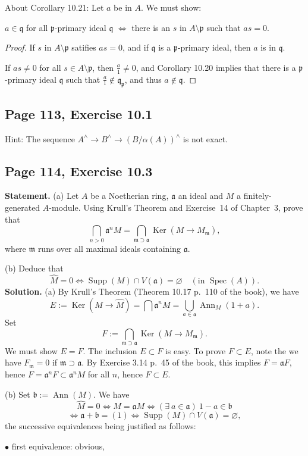 \documentclass[parskip=half,fontsize=12pt]{scrartcl}%
\newcommand{\oo}{\operatorname}\newcommand{\ooo}{\operatorname*}
\newcommand{\mf}{\mathfrak}
\newcommand{\aaa}{\mf a}
\newcommand{\bbb}{\mf b}
\newcommand{\mmm}{\mf m}
\newcommand{\ppp}{\mf p}
\newcommand{\qqq}{\mf q}
\newcommand{\bu}{\bullet}
\newcommand{\Ker}{\operatorname{Ker}}\newcommand{\Coker}{\operatorname{Coker}}
\newcommand{\Spec}{\operatorname{Spec}}\newcommand{\Sp}{\operatorname{Spec}}
\begin{document}
About Corollary 10.21: Let $a$ be in $A$. We must show: 

$a\in\qqq$ for all $\ppp$-primary ideal $\qqq$ $\iff$ there is an $s$ in $A\setminus\ppp$ such that $as=0$. 

\begin{proof} 
If $s$ in $A\setminus\ppp$ satifies $as=0$, and if $\qqq$ is a $\ppp$-primary ideal, then $a$ is in $\qqq$.

If $as\neq0$ for all $s\in A\setminus\ppp$, then $\frac a1\neq0$, and Corollary 10.20 implies that there is a $\ppp$-primary ideal $\qqq$ such that $\frac a1\notin\qqq_\ppp$, and thus $a\notin\qqq$. 
\end{proof}

\subsection{Page 113, Exercise 10.1}%

Hint: The sequence $A^\land\to B^\land\to(B/\alpha(A))^\land$ is not exact. 

\subsection{Page 114, Exercise 10.3}%

\textbf{Statement.} (a) Let $A$ be a Noetherian ring, $\aaa$ an ideal and $M$ a finitely-generated $A$-module. Using Krull's Theorem and Exercise~14 of Chapter~3, prove that 
$$
\bigcap_{n>0}\aaa^nM=\bigcap_{\mmm\supset\aaa}\Ker(M\to M_\mmm),
$$ 
where $\mmm$ runs over all maximal ideals containing $\aaa$.

(b) Deduce that
$$
\widehat M=0\iff\oo{Supp}(M)\cap V(\aaa)=\varnothing\quad(\text{in }\Spec(A)).
$$
\textbf{Solution.} (a) By Krull's Theorem (Theorem 10.17 p.~110 of the book), we have 
$$
E:=\Ker(M\to\widehat M)=\bigcap\aaa^nM=\bigcup_{a\in\aaa}\oo{Ann}_M(1+a). 
$$ 
Set 
$$
F:=\bigcap_{\mmm\supset\aaa}\Ker(M\to M_\mmm). 
$$ 
We must show $E=F$. The inclusion $E\subset F$ is easy. To prove $F\subset E$, note the we have $F_\mmm=0$ if $\mmm\supset\aaa$. By Exercise 3.14 p.~45 of the book, this implies $F=\aaa F$, hence $F=\aaa^nF\subset\aaa^nM$ for all $n$, hence $F\subset E$. 

(b) Set $\bbb:=\oo{Ann}(M)$. We have 
$$
\widehat M=0\iff M=\aaa M\iff(\exists\ a\in\aaa)\ 1-a\in\bbb
$$ 
$$
\iff\aaa+\bbb=(1)\iff\oo{Supp}(M)\cap V(\aaa)=\varnothing,
$$ 
the successive equivalences being justified as follows:

$\bu$ first equivalence: obvious, %
\end{document}
